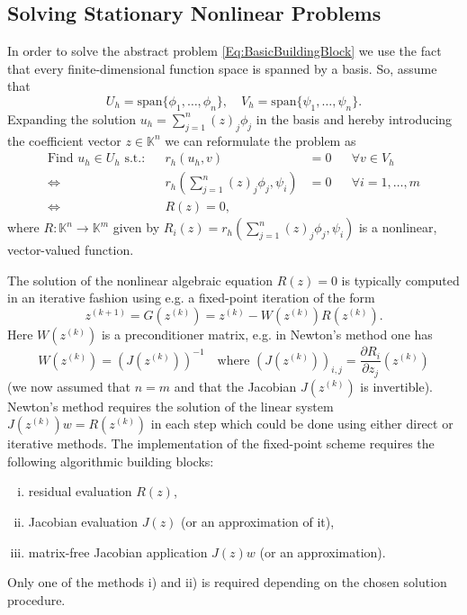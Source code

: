 \documentclass[a4paper,12pt]{article}
\theoremstyle{definition}
\begin{document}
\subsection*{Solving Stationary Nonlinear Problems}

In order to solve the abstract problem \eqref{Eq:BasicBuildingBlock} we use the fact that
every finite-dimensional function space is spanned by a basis. So, assume that
\begin{equation*}
U_h=\text{span}\{\phi_1,\ldots,\phi_n\}, \quad V_h=\text{span}\{\psi_1,\ldots,\psi_n\} .
\end{equation*}
Expanding the solution $u_h=\sum_{j=1}^n (z)_j\phi_j$ in the basis and
hereby introducing the coefficient vector $z\in\mathbb{K}^n$ we can
reformulate the problem as
\begin{align*}
\text{Find $u_h\in U_h$ s.t.:} && r_h(u_h,v)&=0 && \forall v\in V_h\\
\Leftrightarrow{} && r_h\left(\sum_{j=1}^n (z)_j\phi_j,\psi_i\right) &= 0 &&\forall i=1,\ldots,m\\
\Leftrightarrow{} && R(z) = 0,
\end{align*}
where $R: \mathbb{K}^n \to \mathbb{K}^m$ given by 
$R_i(z) = r_h\left(\sum_{j=1}^n (z)_j\phi_j,\psi_i\right)$ is a nonlinear, vector-valued function.

The solution of the nonlinear algebraic equation $R(z)=0$ is typically computed
in an iterative fashion using e.g. a fixed-point iteration of the form
\begin{equation}
z^{(k+1)} = G(z^{(k)}) = z^{(k)} - W(z^{(k)}) R(z^{(k)}) .
\end{equation}
Here $W(z^{(k)})$ is a preconditioner matrix, e.g. in Newton's method one
has 
\begin{equation*}
W(z^{(k)}) = (J(z^{(k)}))^{-1} \quad \text{where $(J(z^{(k)}))_{i,j} = \frac{\partial R_i}{\partial z_j}
(z^{(k)})$}
\end{equation*}
(we now assumed that $n=m$ and that the Jacobian $J(z^{(k)})$ is invertible).
Newton's method requires the solution of the linear system $J(z^{(k)}) w = R(z^{(k)})$ in each
step which could be done using either direct or iterative methods.
The implementation of the fixed-point scheme requires the following
algorithmic building blocks:
\begin{enumerate}[i)]
\item residual evaluation $R(z)$,
\item Jacobian evaluation $J(z)$ (or an approximation of it),
\item matrix-free Jacobian application $J(z) w$ (or an approximation).
\end{enumerate}
Only one of the methods i) and ii) is required depending on the chosen
solution procedure.
\end{document}
